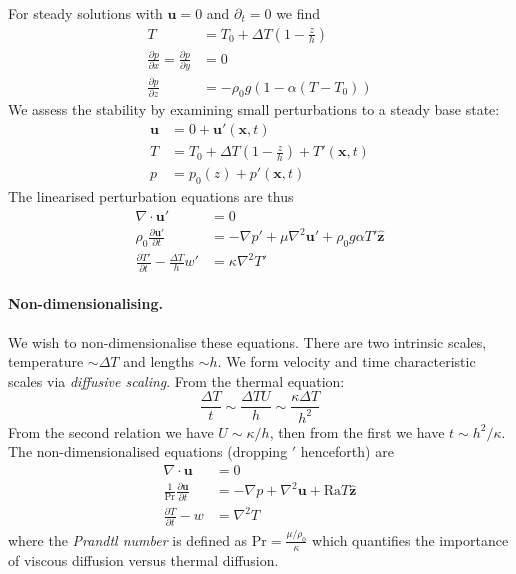 \documentclass{jknotes}
\begin{document}
For steady solutions with $\symbf{u} = 0$ and $\partial_t = 0$ we find
\begin{align}
	T &= T_0 + \Delta T \left(1-\frac{z}{h}\right) \\
	\frac{\partial p}{\partial x} = \frac{\partial p}{\partial y} &= 0 \\
	\frac{\partial p}{\partial z} &= - \rho_0 g \left( 1- \alpha
	(T-T_0)\right) 
\end{align}
We assess the stability by examining small perturbations to a steady base
state:
\begin{align}
	\symbf{u} &= 0 + \symbf{u}'(\symbf{x},t) \\
	T &= T_0 + \Delta T \left(1-\frac{z}{h}\right) + T'(\symbf{x},t) \\
	p &= p_0(z) + p'(\symbf{x},t) 
\end{align}
The linearised perturbation equations are thus
\begin{align}
	\nabla \cdot \symbf{u}' &= 0  \\
	\rho_0  \frac{\partial \symbf{u}'}{\partial t} &= - \nabla p' + \mu
	\nabla^2 \symbf{u}' + \rho_0 g \alpha T' \hat{\symbf{z}} \\
	\frac{\partial T'}{\partial t} - \frac{\Delta T}{h} w' &= \kappa \nabla^2
	T'
\end{align}

\paragraph{Non-dimensionalising.}
We wish to non-dimensionalise these equations. There are two intrinsic
scales, temperature $\sim \Delta T$ and lengths $\sim h$. We form velocity and
time characteristic scales via \emph{diffusive scaling}. From the thermal
equation:
\begin{equation}
	\frac{\Delta T}{t} \sim \frac{\Delta T U}{h} \sim \frac{\kappa \Delta
	T}{h^2}
\end{equation}
From the second relation we have $U \sim \kappa/h$, then from the first we
have $t \sim h^2/\kappa$.  The non-dimensionalised equations (dropping $'$
henceforth) are
\begin{align}
	\nabla \cdot \symbf{u} &= 0 \label{eq:L2:1}\\
	\frac{1}{\text{Pr}} \frac{\partial \symbf{u}}{\partial t} &= - \nabla p +
	\nabla^2 \symbf{u} + \text{Ra}T \hat{\symbf{z}} \label{eq:L2:2}\\
	\frac{\partial T}{\partial  t} - w &= \nabla^2 T  \label{eq:L2:3}
\end{align}
where the \emph{Prandtl number} is defined as $\text{Pr} =
\frac{\mu/\rho_0}{\kappa}$ which quantifies the importance of viscous
diffusion versus thermal diffusion.
\end{document}
